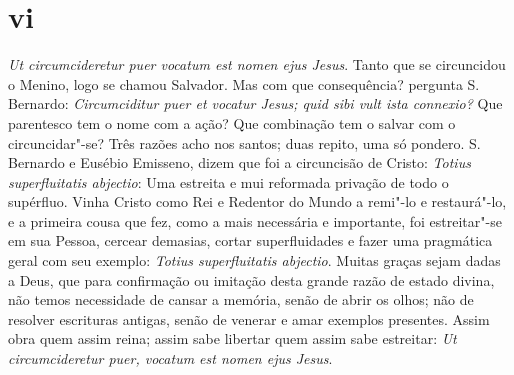 \section*{vi}

\emph{Ut circumcideretur puer vocatum est nomen ejus Jesus}. Tanto que
se circuncidou o Menino, logo se chamou Salvador. Mas com que
consequência? pergunta S.\,Bernardo: \emph{Circumciditur puer et
vocatur Jesus; quid sibi vult ista connexio?} Que parentesco tem o nome
com a ação? Que combinação tem o salvar com o circuncidar"-se? Três
razões acho nos santos; duas repito, uma só pondero. S.\,Bernardo e
Eusébio Emisseno, dizem que foi a circuncisão de Cristo: \emph{Totius
superfluitatis abjectio}: Uma estreita e mui reformada privação de todo
o supérfluo. Vinha Cristo como Rei e Redentor do Mundo a remi"-lo e
restaurá"-lo, e a primeira cousa que fez, como a mais necessária e
importante, foi estreitar"-se em sua Pessoa, cercear demasias, cortar
superfluidades e fazer uma pragmática geral com seu exemplo:
\emph{Totius superfluitatis abjectio}. Muitas graças sejam dadas a Deus,
que para confirmação ou imitação desta grande razão de estado divina,
não temos necessidade de cansar a memória, senão de abrir os olhos; não
de resolver escrituras antigas, senão de venerar e amar exemplos
presentes. Assim obra quem assim reina; assim sabe libertar quem assim
sabe estreitar: \emph{Ut circumcideretur puer, vocatum est nomen ejus
Jesus}.

